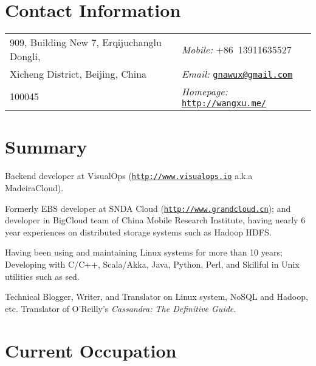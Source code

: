 \documentclass[a4paper,margin,line]{res}
\newcommand{\http}{http:/\hspace{-0.3ex}/}
\begin{document}

\begin{resume}

\section{\sc Contact Information}
\vspace{.05in}
\begin{tabular}{@{}p{2.9in}|p{2.5in}}
909, Building New 7, Erqijuchanglu Dongli, & \textit{Mobile:} +86~13911635527\\
Xicheng District, Beijing, China            & \textit{Email:}  \href{mailto:gnawux@gmail.com}{\tt gnawux@gmail.com} \\
100045                                      & \textit{Homepage:} \href{http://wangxu.me/}{\tt \http{}wangxu.me/} \\
                                                                   
\end{tabular}

\section{\sc Summary}

Backend developer at VisualOps (\href{http://www.visualops.io}{\tt \http{}www.visualops.io} a.k.a MadeiraCloud).

Formerly EBS developer at SNDA Cloud (\href{http://www.grandcloud.cn}{\tt \http{}www.grandcloud.cn}); and developer in BigCloud team of China Mobile Research Institute, having nearly 6 year experiences on distributed storage systems such as Hadoop HDFS. 

Having been using and maintaining Linux systems for more than 10 years; Developing with C/C++, Scala/Akka, Java, Python, Perl, and Skillful in Unix utilities such as sed.

Technical Blogger, Writer, and Translator on Linux system, NoSQL and Hadoop, etc. Translator of O'Reilly's \textit{Cassandra: The Definitive Guide}\/.

\section{\sc Current Occupation}


\end{resume}
\end{document}
